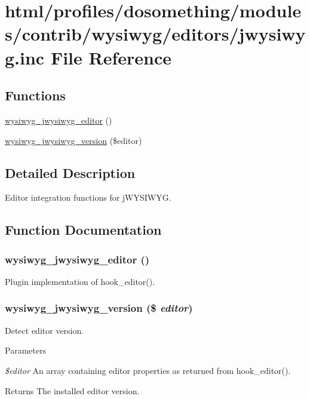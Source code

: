 \hypertarget{jwysiwyg_8inc}{
\section{html/profiles/dosomething/modules/contrib/wysiwyg/editors/jwysiwyg.inc File Reference}
\label{jwysiwyg_8inc}
}
\subsection*{Functions}
\begin{DoxyCompactItemize}
\item 
\hyperlink{jwysiwyg_8inc_aa532170029f232a65662f15ddafd77e9}{wysiwyg\_\-jwysiwyg\_\-editor} ()
\item 
\hyperlink{jwysiwyg_8inc_a0b3e9d609dc0e6dd8d9ca75983333217}{wysiwyg\_\-jwysiwyg\_\-version} (\$editor)
\end{DoxyCompactItemize}


\subsection{Detailed Description}
Editor integration functions for jWYSIWYG. 

\subsection{Function Documentation}
\hypertarget{jwysiwyg_8inc_aa532170029f232a65662f15ddafd77e9}{
\subsubsection[{wysiwyg\_\-jwysiwyg\_\-editor}]{\setlength{\rightskip}{0pt plus 5cm}wysiwyg\_\-jwysiwyg\_\-editor ()}}
\label{jwysiwyg_8inc_aa532170029f232a65662f15ddafd77e9}
Plugin implementation of hook\_\-editor(). \hypertarget{jwysiwyg_8inc_a0b3e9d609dc0e6dd8d9ca75983333217}{
\subsubsection[{wysiwyg\_\-jwysiwyg\_\-version}]{\setlength{\rightskip}{0pt plus 5cm}wysiwyg\_\-jwysiwyg\_\-version (\$ {\em editor})}}
\label{jwysiwyg_8inc_a0b3e9d609dc0e6dd8d9ca75983333217}
Detect editor version.


\begin{DoxyParams}{Parameters}
\item[{\em \$editor}]An array containing editor properties as returned from hook\_\-editor().\end{DoxyParams}
\begin{DoxyReturn}{Returns}
The installed editor version. 
\end{DoxyReturn}
